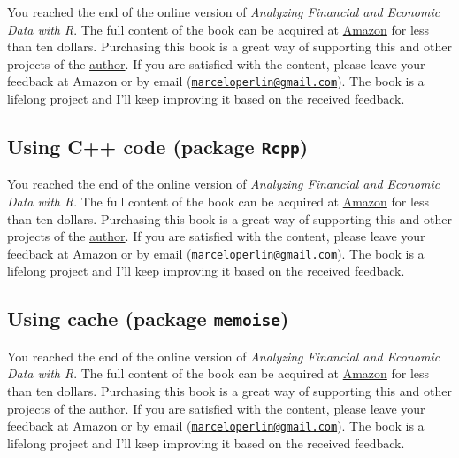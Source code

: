 \documentclass[
  12pt,
]{book}
\newenvironment{pleasebuyit}
{\begin{noteblock}
		
	} {\end{noteblock}}
\begin{document}
\begin{pleasebuyit}
You reached the end of the online version of \emph{Analyzing Financial
and Economic Data with R}. The full content of the book can be acquired
at \href{https://www.amazon.com/dp/B084LSNXMN}{Amazon} for less than ten
dollars. Purchasing this book is a great way of supporting this and
other projects of the \href{https://www.msperlin.com/blog/}{author}. If
you are satisfied with the content, please leave your feedback at Amazon
or by email
(\href{mailto:marceloperlin@gmail.com}{\nolinkurl{marceloperlin@gmail.com}}).
The book is a lifelong project and I'll keep improving it based on the
received feedback.
\end{pleasebuyit}

\hypertarget{using-c-code-package-rcpp}{%
\subsection{\texorpdfstring{Using C++ code (package \texttt{Rcpp})}{Using C++ code (package Rcpp)}}\label{using-c-code-package-rcpp}}

\begin{pleasebuyit}
You reached the end of the online version of \emph{Analyzing Financial
and Economic Data with R}. The full content of the book can be acquired
at \href{https://www.amazon.com/dp/B084LSNXMN}{Amazon} for less than ten
dollars. Purchasing this book is a great way of supporting this and
other projects of the \href{https://www.msperlin.com/blog/}{author}. If
you are satisfied with the content, please leave your feedback at Amazon
or by email
(\href{mailto:marceloperlin@gmail.com}{\nolinkurl{marceloperlin@gmail.com}}).
The book is a lifelong project and I'll keep improving it based on the
received feedback.
\end{pleasebuyit}

\hypertarget{using-cache-package-memoise}{%
\subsection{\texorpdfstring{Using cache (package \texttt{memoise})}{Using cache (package memoise)}}\label{using-cache-package-memoise}}

\begin{pleasebuyit}
You reached the end of the online version of \emph{Analyzing Financial
and Economic Data with R}. The full content of the book can be acquired
at \href{https://www.amazon.com/dp/B084LSNXMN}{Amazon} for less than ten
dollars. Purchasing this book is a great way of supporting this and
other projects of the \href{https://www.msperlin.com/blog/}{author}. If
you are satisfied with the content, please leave your feedback at Amazon
or by email
(\href{mailto:marceloperlin@gmail.com}{\nolinkurl{marceloperlin@gmail.com}}).
The book is a lifelong project and I'll keep improving it based on the
received feedback.
\end{pleasebuyit}
\end{document}
